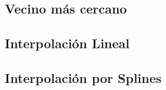 \subsection{Vecino más cercano}

\subsection{Interpolación Lineal}

\subsection{Interpolación por Splines}